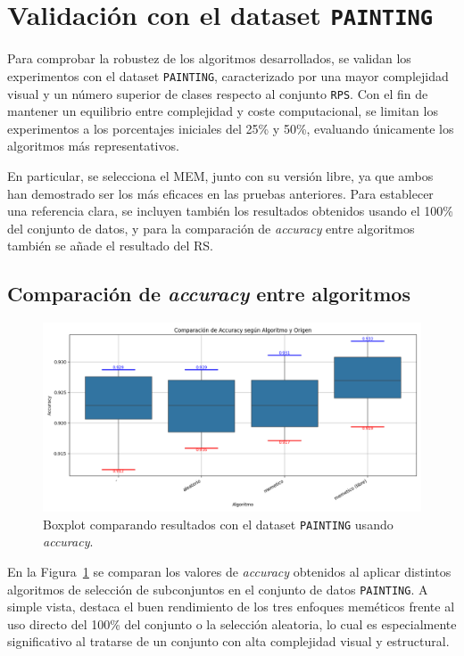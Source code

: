 \section{Validación con el dataset \texttt{PAINTING}}\label{sec:validacion-con-painting}
Para comprobar la robustez de los algoritmos desarrollados, se validan los experimentos con el dataset \texttt{PAINTING},
caracterizado por una mayor complejidad visual y un número superior de clases respecto al conjunto \texttt{RPS}.
Con el fin de mantener un equilibrio entre complejidad y coste computacional, se limitan los experimentos a los porcentajes iniciales del 25\% y 50\%,
evaluando únicamente los algoritmos más representativos.

En particular, se selecciona el MEM, junto con su versión libre, ya que ambos han demostrado ser los más eficaces en las pruebas anteriores.
Para establecer una referencia clara, se incluyen también los resultados obtenidos usando el 100\% del conjunto de datos, y para la comparación de
\textit{accuracy} entre algoritmos también se añade el resultado del RS.

\subsection{Comparación de \textit{accuracy} entre algoritmos}
\begin{figure}[htp]
    \centering
    \includegraphics[width=1\textwidth]{imagenes/evaluaciones/painting/comparacion-por-algoritmo}
    \caption{Boxplot comparando resultados con el dataset \texttt{PAINTING} usando \textit{accuracy}.}
    \label{fig:comparacion-por-algoritmo}
\end{figure}

En la Figura~\ref{fig:comparacion-por-algoritmo} se comparan los valores de \textit{accuracy} obtenidos al aplicar distintos
algoritmos de selección de subconjuntos en el conjunto de datos \texttt{PAINTING}.
A simple vista, destaca el buen rendimiento de los tres enfoques meméticos frente al uso directo del 100\% del conjunto o la selección aleatoria,
lo cual es especialmente significativo al tratarse de un conjunto con alta complejidad visual y estructural.

